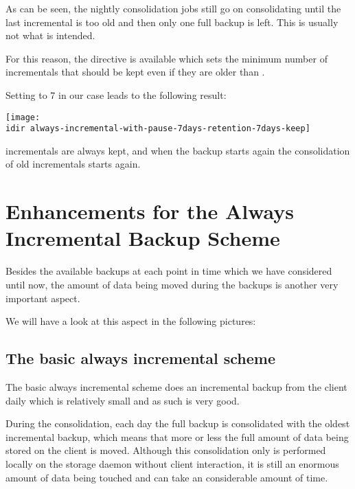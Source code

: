 As can be seen, the nightly consolidation jobs still go on consolidating until the last incremental is too old and then only one full backup is left. This is usually not what is intended.

For this reason, the directive  is available which sets the minimum number of incrementals that should be kept even if they are older than .

Setting  to 7 in our case leads to the following result:

\begin{center}
\texttt{[image: \\idir always-incremental-with-pause-7days-retention-7days-keep]}
\end{center}

 incrementals are always kept, and when the backup starts again the consolidation of old incrementals starts again.


\section{Enhancements for the Always Incremental Backup Scheme}

Besides the available backups at each point in time which we have considered until now, the amount of data being moved during the backups is another very important aspect.

We will have a look at this aspect in the following pictures:


\subsection{The basic always incremental scheme}

The basic always incremental scheme does an incremental backup from the client daily which is relatively small and as such is very good.

During the consolidation, each day the full backup is consolidated with the oldest incremental backup, which means that more or less the full amount of data being stored on the client is moved.
Although this consolidation only is performed locally on the storage daemon without client interaction, it is still an enormous amount of data being touched and can take an considerable amount of time.

